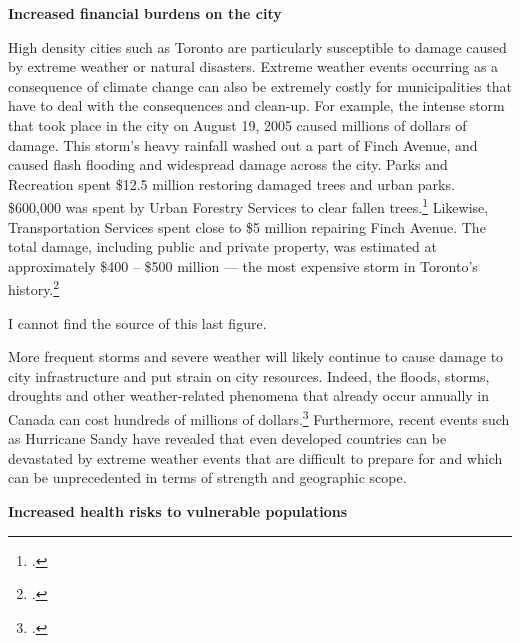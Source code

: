 \textbf{Increased financial burdens on the city}



High density cities such as Toronto are particularly susceptible to damage caused by extreme weather or natural disasters. 
Extreme weather events occurring as a consequence of climate change can also be extremely costly for municipalities that have to deal with the consequences and clean-up. 
For example, the intense storm that took place in the city on August 19, 2005 caused millions of dollars of damage. 
This storm's heavy rainfall washed out a part of Finch Avenue, and caused flash flooding and widespread damage across the city. 
Parks and Recreation spent \$12.5 million restoring damaged trees and urban parks. 
\$600,000 was spent by Urban Forestry Services to clear fallen trees.\footcite[][p. iii]{ScanCCToronto}
Likewise, Transportation Services spent close to \$5 million repairing Finch Avenue. 
The total damage, including public and private property, was estimated at approximately \$400 -- \$500 million --- the most expensive storm in Toronto's history.\footcite[][p. 11]{TorontoAheadStorm}



\begin{vcom}
I cannot find the source of this last figure.
\end{vcom}



More frequent storms and severe weather will likely continue to cause damage to city infrastructure and put strain on city resources. 
Indeed, the floods, storms, droughts and other weather-related phenomena that already occur annually in Canada can cost hundreds of millions of dollars.\footcite[][p. 11]{HHInACC}
Furthermore, recent events such as Hurricane Sandy have revealed that even developed countries can be devastated by extreme weather events that are difficult to prepare for and which can be unprecedented in terms of strength and geographic scope.   



\textbf{Increased health risks to vulnerable populations}



